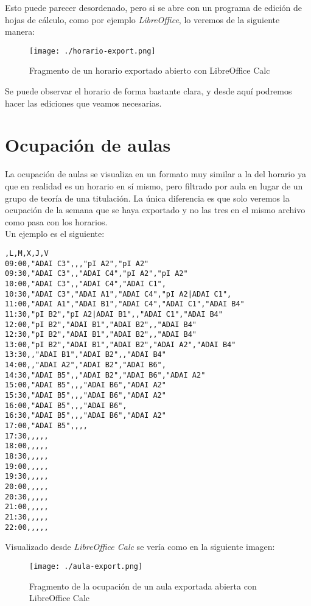 Esto puede parecer desordenado, pero si se abre con un programa de edición de hojas de cálculo, como por ejemplo {\em LibreOffice}, lo veremos de la siguiente manera:


\begin{figure}[H] 
  \label{informes-horario} 
	\begin{center}
    \texttt{[image: ./horario-export.png]}
  \end{center}
\caption{Fragmento de un horario exportado abierto con LibreOffice Calc}
\end{figure}

Se puede observar el horario de forma bastante clara, y desde aquí podremos hacer las ediciones que veamos necesarias.

\section{Ocupación de aulas}

La ocupación de aulas se visualiza en un formato muy similar a la del horario ya que en realidad es un horario en sí mismo, pero filtrado por aula en lugar de un grupo de teoría de una titulación. La única diferencia es que solo veremos la ocupación de la semana que se haya exportado y no las tres en el mismo archivo como pasa con los horarios.
\\
Un ejemplo es el siguiente:
\begin{verbatim}
,L,M,X,J,V
09:00,"ADAI C3",,,"pI A2","pI A2"
09:30,"ADAI C3",,"ADAI C4","pI A2","pI A2"
10:00,"ADAI C3",,"ADAI C4","ADAI C1",
10:30,"ADAI C3","ADAI A1","ADAI C4","pI A2|ADAI C1",
11:00,"ADAI A1","ADAI B1","ADAI C4","ADAI C1","ADAI B4"
11:30,"pI B2","pI A2|ADAI B1",,"ADAI C1","ADAI B4"
12:00,"pI B2","ADAI B1","ADAI B2",,"ADAI B4"
12:30,"pI B2","ADAI B1","ADAI B2",,"ADAI B4"
13:00,"pI B2","ADAI B1","ADAI B2","ADAI A2","ADAI B4"
13:30,,"ADAI B1","ADAI B2",,"ADAI B4"
14:00,,"ADAI A2","ADAI B2","ADAI B6",
14:30,"ADAI B5",,"ADAI B2","ADAI B6","ADAI A2"
15:00,"ADAI B5",,,"ADAI B6","ADAI A2"
15:30,"ADAI B5",,,"ADAI B6","ADAI A2"
16:00,"ADAI B5",,,"ADAI B6",
16:30,"ADAI B5",,,"ADAI B6","ADAI A2"
17:00,"ADAI B5",,,,
17:30,,,,,
18:00,,,,,
18:30,,,,,
19:00,,,,,
19:30,,,,,
20:00,,,,,
20:30,,,,,
21:00,,,,,
21:30,,,,,
22:00,,,,,
\end{verbatim}

Visualizado desde {\em LibreOffice Calc} se vería como en la siguiente imagen:

\begin{figure}[H] 
  \label{informes-ocupacion} 
	\begin{center}
    \texttt{[image: ./aula-export.png]}
  \end{center}
\caption{Fragmento de la ocupación de un aula exportada abierta con LibreOffice Calc}
\end{figure}

